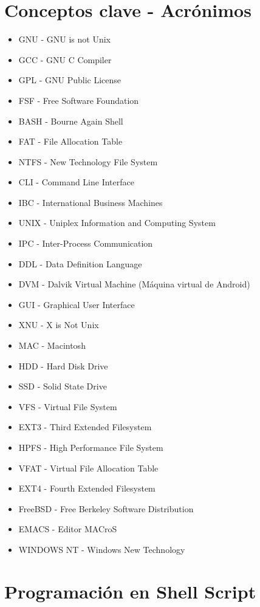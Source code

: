 \documentclass[11pt,twoside]{book}
\begin{document}
\section{Conceptos clave - Acrónimos}
\begin{itemize}
    \item GNU - GNU is not Unix
    \item GCC - GNU C Compiler
    \item GPL - GNU Public License
    \item FSF - Free Software Foundation
    \item BASH - Bourne Again Shell
    \item FAT - File Allocation Table
    \item NTFS - New Technology File System
    \item CLI - Command Line Interface
    \item IBC - International Business Machines
    \item UNIX - Uniplex Information and Computing System
    \item IPC - Inter-Process Communication
    \item DDL - Data Definition Language
    \item DVM - Dalvik Virtual Machine (Máquina virtual de Android)
    \item GUI - Graphical User Interface
    \item XNU - X is Not Unix
    \item MAC - Macintosh
    \item HDD - Hard Disk Drive
    \item SSD - Solid State Drive
    \item VFS - Virtual File System
    \item EXT3 - Third Extended Filesystem
    \item HPFS - High Performance File System
    \item VFAT - Virtual File Allocation Table
    \item EXT4 - Fourth Extended Filesystem
    \item FreeBSD - Free Berkeley Software Distribution
    \item EMACS - Editor MACroS
    \item WINDOWS NT - Windows New Technology
\end{itemize} 

\section{Programación en Shell Script}
\end{document}
